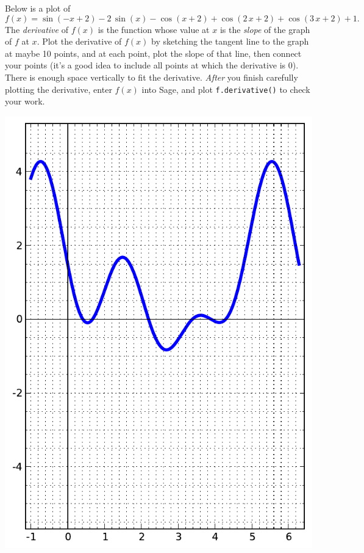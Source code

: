 Below is a plot of $$f(x)=\sin\left(-x + 2\right) - 2 \, \sin\left(x\right) - \cos\left(x + 2\right) + \cos\left(2 \, x + 2\right) + \cos\left(3 \, x + 2\right) + 1.$$  The {\em \color{red}derivative} of $f(x)$ is the function whose value at $x$ is the {\em slope} of the graph of $f$ at $x$.  Plot the derivative of $f(x)$ by sketching the tangent line to the graph at maybe 10 points, and at each point, plot the slope of that line, then connect your points (it's a good idea to include all points at which the derivative is 0).  There is enough space vertically to fit the derivative.  {\em After} you finish carefully plotting the derivative, enter $f(x)$ into Sage, and plot {\color{blue}\verb|f.derivative()|} to check your work.
\begin{center}\includegraphics{functions/5.pdf}\end{center}\newpage

